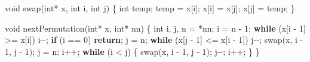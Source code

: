 \documentclass[
  12pt,
  letterpaper,
  DIV=11,
  numbers=noendperiod]{scrreprt}
\newenvironment{Shaded}{\begin{snugshade}}{\end{snugshade}}
\newcommand{\ControlFlowTok}[1]{\textcolor[rgb]{0.00,0.23,0.31}{\textbf{#1}}}
\newcommand{\DataTypeTok}[1]{\textcolor[rgb]{0.68,0.00,0.00}{#1}}
\newcommand{\DecValTok}[1]{\textcolor[rgb]{0.68,0.00,0.00}{#1}}
\newcommand{\NormalTok}[1]{\textcolor[rgb]{0.00,0.23,0.31}{#1}}
\newcommand{\OperatorTok}[1]{\textcolor[rgb]{0.37,0.37,0.37}{#1}}
\theoremstyle{remark}
\begin{document}
\begin{Shaded}
\begin{Highlighting}[]

\DataTypeTok{void}\NormalTok{ swap}\OperatorTok{(}\DataTypeTok{int}\OperatorTok{*}\NormalTok{ x}\OperatorTok{,} \DataTypeTok{int}\NormalTok{ i}\OperatorTok{,} \DataTypeTok{int}\NormalTok{ j}\OperatorTok{)} \OperatorTok{\{}
    \DataTypeTok{int}\NormalTok{ temp}\OperatorTok{;}
\NormalTok{    temp }\OperatorTok{=}\NormalTok{ x}\OperatorTok{[}\NormalTok{i}\OperatorTok{];}
\NormalTok{    x}\OperatorTok{[}\NormalTok{i}\OperatorTok{]} \OperatorTok{=}\NormalTok{ x}\OperatorTok{[}\NormalTok{j}\OperatorTok{];}
\NormalTok{    x}\OperatorTok{[}\NormalTok{j}\OperatorTok{]} \OperatorTok{=}\NormalTok{ temp}\OperatorTok{;}
\OperatorTok{\}}

\DataTypeTok{void}\NormalTok{ nextPermutation}\OperatorTok{(}\DataTypeTok{int}\OperatorTok{*}\NormalTok{ x}\OperatorTok{,} \DataTypeTok{int}\OperatorTok{*}\NormalTok{ nn}\OperatorTok{)} \OperatorTok{\{}
    \DataTypeTok{int}\NormalTok{ i}\OperatorTok{,}\NormalTok{ j}\OperatorTok{,}\NormalTok{ n }\OperatorTok{=} \OperatorTok{*}\NormalTok{nn}\OperatorTok{;}
\NormalTok{    i }\OperatorTok{=}\NormalTok{ n }\OperatorTok{{-}} \DecValTok{1}\OperatorTok{;}
    \ControlFlowTok{while} \OperatorTok{(}\NormalTok{x}\OperatorTok{[}\NormalTok{i }\OperatorTok{{-}} \DecValTok{1}\OperatorTok{]} \OperatorTok{\textgreater{}=}\NormalTok{ x}\OperatorTok{[}\NormalTok{i}\OperatorTok{])}\NormalTok{ i}\OperatorTok{{-}{-};}
    \ControlFlowTok{if} \OperatorTok{(}\NormalTok{i }\OperatorTok{==} \DecValTok{0}\OperatorTok{)} \ControlFlowTok{return}\OperatorTok{;}
\NormalTok{    j }\OperatorTok{=}\NormalTok{ n}\OperatorTok{;}
    \ControlFlowTok{while} \OperatorTok{(}\NormalTok{x}\OperatorTok{[}\NormalTok{j }\OperatorTok{{-}} \DecValTok{1}\OperatorTok{]} \OperatorTok{\textless{}=}\NormalTok{ x}\OperatorTok{[}\NormalTok{i }\OperatorTok{{-}} \DecValTok{1}\OperatorTok{])}\NormalTok{ j}\OperatorTok{{-}{-};}
\NormalTok{    swap}\OperatorTok{(}\NormalTok{x}\OperatorTok{,}\NormalTok{ i }\OperatorTok{{-}} \DecValTok{1}\OperatorTok{,}\NormalTok{ j }\OperatorTok{{-}} \DecValTok{1}\OperatorTok{);}
\NormalTok{    j }\OperatorTok{=}\NormalTok{ n}\OperatorTok{;}
\NormalTok{    i}\OperatorTok{++;}
    \ControlFlowTok{while} \OperatorTok{(}\NormalTok{i }\OperatorTok{\textless{}}\NormalTok{ j}\OperatorTok{)} \OperatorTok{\{}
\NormalTok{        swap}\OperatorTok{(}\NormalTok{x}\OperatorTok{,}\NormalTok{ i }\OperatorTok{{-}} \DecValTok{1}\OperatorTok{,}\NormalTok{ j }\OperatorTok{{-}} \DecValTok{1}\OperatorTok{);}
\NormalTok{        j}\OperatorTok{{-}{-};}
\NormalTok{        i}\OperatorTok{++;}
    \OperatorTok{\}}
\OperatorTok{\}}


\end{Highlighting}
\end{Shaded}
\end{document}
